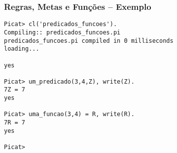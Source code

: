 \begin{frame} [fragile]

\frametitle{Regras, Metas e Funções -- Exemplo}
\begin{footnotesize}
\begin{verbatim}
Picat> cl('predicados_funcoes').
Compiling:: predicados_funcoes.pi
predicados_funcoes.pi compiled in 0 milliseconds
loading...

yes

Picat> um_predicado(3,4,Z), write(Z).
7Z = 7
yes

Picat> uma_funcao(3,4) = R, write(R).
7R = 7
yes

Picat>
\end{verbatim}
\end{footnotesize}
\end{frame}


